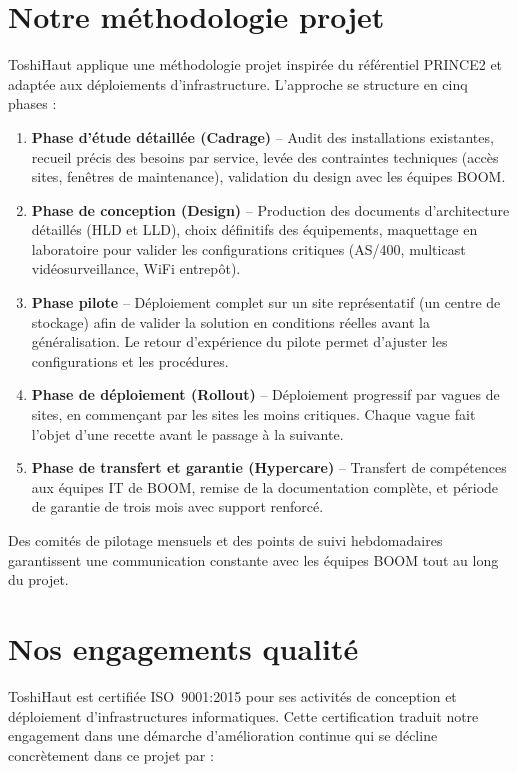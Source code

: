 \documentclass[12pt,a4paper]{report}
\begin{document}
\section{Notre méthodologie projet}

ToshiHaut applique une méthodologie projet inspirée du référentiel PRINCE2 et adaptée aux déploiements d'infrastructure. L'approche se structure en cinq phases :

\begin{enumerate}
\item \textbf{Phase d'étude détaillée (Cadrage)} -- Audit des installations existantes, recueil précis des besoins par service, levée des contraintes techniques (accès sites, fenêtres de maintenance), validation du design avec les équipes BOOM.

\item \textbf{Phase de conception (Design)} -- Production des documents d'architecture détaillés (HLD et LLD), choix définitifs des équipements, maquettage en laboratoire pour valider les configurations critiques (AS/400, multicast vidéosurveillance, WiFi entrepôt).

\item \textbf{Phase pilote} -- Déploiement complet sur un site représentatif (un centre de stockage) afin de valider la solution en conditions réelles avant la généralisation. Le retour d'expérience du pilote permet d'ajuster les configurations et les procédures.

\item \textbf{Phase de déploiement (Rollout)} -- Déploiement progressif par vagues de sites, en commençant par les sites les moins critiques. Chaque vague fait l'objet d'une recette avant le passage à la suivante.

\item \textbf{Phase de transfert et garantie (Hypercare)} -- Transfert de compétences aux équipes IT de BOOM, remise de la documentation complète, et période de garantie de trois mois avec support renforcé.
\end{enumerate}

Des comités de pilotage mensuels et des points de suivi hebdomadaires garantissent une communication constante avec les équipes BOOM tout au long du projet.

\section{Nos engagements qualité}

ToshiHaut est certifiée ISO~9001:2015 pour ses activités de conception et déploiement d'infrastructures informatiques. Cette certification traduit notre engagement dans une démarche d'amélioration continue qui se décline concrètement dans ce projet par :
\end{document}
